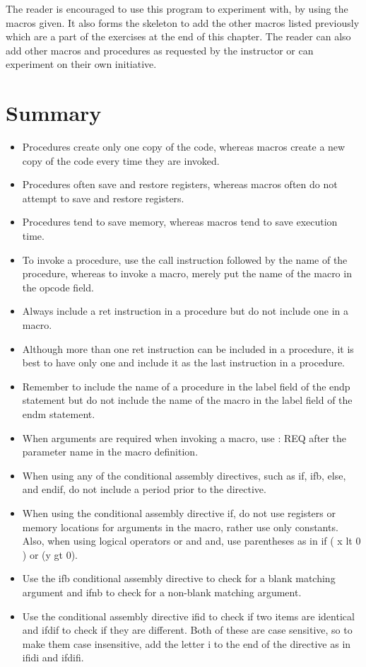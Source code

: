 \documentclass[10pt]{book}
\begin{document}
The reader is encouraged to use this program to experiment with, by using the macros given. It also forms the skeleton to add the other macros listed previously which are a part of the exercises at the end of this chapter. The reader can also add other macros and procedures as requested by the instructor or can experiment on their own initiative.

\section{Summary}
\begin{itemize}
  \item Procedures create only one copy of the code, whereas macros create a new copy of the code every time they are invoked.
  \item Procedures often save and restore registers, whereas macros often do not attempt to save and restore registers.
  \item Procedures tend to save memory, whereas macros tend to save execution time.
  \item To invoke a procedure, use the call instruction followed by the name of the procedure, whereas to invoke a macro, merely put the name of the macro in the opcode field.
  \item Always include a ret instruction in a procedure but do not include one in a macro.
  \item Although more than one ret instruction can be included in a procedure, it is best to have only one and include it as the last instruction in a procedure.
  \item Remember to include the name of a procedure in the label field of the endp statement but do not include the name of the macro in the label field of the endm statement.
  \item When arguments are required when invoking a macro, use : REQ after the parameter name in the macro definition.
  \item When using any of the conditional assembly directives, such as if, ifb, else, and endif, do not include a period prior to the directive.
  \item When using the conditional assembly directive if, do not use registers or memory locations for arguments in the macro, rather use only constants. Also, when using logical operators or and and, use parentheses as in if ( x lt 0 ) or (y gt 0).
  \item Use the ifb conditional assembly directive to check for a blank matching argument and ifnb to check for a non-blank matching argument.
  \item Use the conditional assembly directive ifid to check if two items are identical and ifdif to check if they are different. Both of these are case sensitive, so to make them case insensitive, add the letter i to the end of the directive as in ifidi and ifdifi.
\end{itemize}
\end{document}
